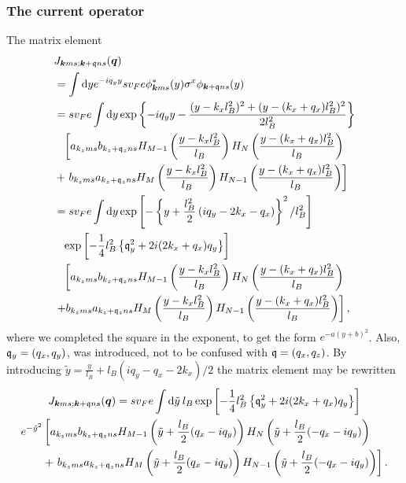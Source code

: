 \subsubsection{The current operator}
The matrix element
\begin{align}
  &J_{\vec{k}ms; \vec{k}+\qvec{q} ns}(\vec{q})\\
  \nonumber &=  \int \mathrm{d}y
    e^{-iq_yy} sv_Fe \phi ^{*}_{\vec{k} ms}(y)
    \sigma ^x
    \phi _{\vec{k} +\qvec{q} ns}(y)\\
  &= s v_F e \int \mathrm{d}y
    \exp \left\{
    - i q_yy - \frac{(y-k_xl_B^2)^2 + (y-(k_x + q_x) l_B^2)^2}{2 l_B^2}
    \right\}\\
  \nonumber &\pe \left[
    a_{k_zms}b_{k_z + \qvec{q}_z ns} H_{M-1} \left( \frac{y - k_xl_B^2}{l_B} \right) H_N\left( \frac{y - (k_x + q_x) l_B^2}{l_B} \right)\right.\\
  \nonumber &+
    \left.  b_{k_zms} a_{k_z + \qvec{q}_z ns}
    H_M \left( \frac{y - k_xl_B^2}{l_B} \right)
    H_{N-1} \left( \frac{y - (k_x+ q_x) l_B^2}{l_B} \right)
    \right]\\
  &= s v_F e \int \mathrm{d}y
    \exp \left[-\left\{
    y+ \frac{l_B^2}{2} \left( iq_y - 2k_x - q_x \right)
    \right\}^2 /l_B^2\right]\\
  \nonumber &\pe \exp \left[- \frac{1}{4} l_B^2 \left\{
    \qvec{q}_y^2 + 2 i (2k_x + q_x) q_y 
    \right\}\right]\\
  \nonumber &\pe \left[
    a_{k_zms}b_{k_z + \qvec{q}_z ns} H_{M-1} \left( \frac{y - k_xl_B^2}{l_B} \right) H_N\left( \frac{y - (k_x + q_x) l_B^2}{l_B} \right) \right.\\
  \nonumber &\left. +
    b_{k_zms} a_{k_z + \qvec{q}_z ns}
    H_M \left( \frac{y - k_xl_B^2}{l_B} \right)
    H_{N-1} \left( \frac{y - (k_x + q_x) l_B^2}{l_B} \right)
    \right],
\end{align}
where we completed the square in the exponent, to get the form $e^{-a(y + b)^2}$.
Also, $\mathfrak{q}_y=(q_x, q_y)$, was introduced, not to be confused with $\mathfrak{q} = (q_x, q_z)$.
By introducing $\tilde{y} = \frac{y}{l_{B}} + l_B(iq_y - q_x - 2 k_x) / 2$ the matrix element may be rewritten
\begin{multline}
  \label{eq:73}
    J_{\bm{k}ms; \bm{k}+\mathfrak{q} ns}(\bm{q}) =
    s v_F e \int \mathrm{d}\tilde{y} \: l_B
\exp \left[- \frac{1}{4} l_B^2 \left\{
    \mathfrak{q}_y^2 + 2 i (2k_x + q_x) q_y 
    \right\}\right]\\
  \begin{split}
  e^{-\tilde{y}^2}
   &\left[
    a_{k_zms}b_{k_z + \mathfrak{q}_z ns}
    H_{M-1} \left( \tilde{y} + \frac{l_B}{2}(q_x - iq_y) \right)
    H_N\left( \tilde{y} + \frac{l_B}{2}(-q_x - iq_y) \right) \right.\\
    &+\left.
    b_{k_zms} a_{k_z + \mathfrak{q}_z ns}
    H_M \left( \tilde{y} + \frac{l_B}{2}(q_x - iq_y) \right)
    H_{N-1} \left( \tilde{y} +  \frac{l_B}{2}(-q_x - iq_y)\right)
    \right].
  \end{split}
\end{multline}
